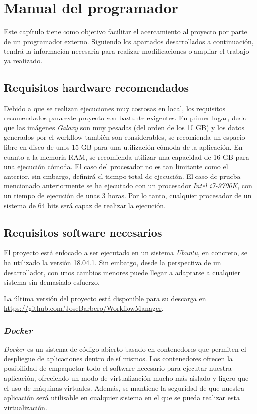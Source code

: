 \chapter{Manual del programador}
\label{Anexo:ManualProgramador}
Este capítulo tiene como objetivo facilitar el acercamiento al proyecto por parte de un programador externo. Siguiendo los apartados desarrollados a continuación, tendrá la información necesaria para realizar modificaciones o ampliar el trabajo ya realizado.

\section{Requisitos hardware recomendados}
Debido a que se realizan ejecuciones muy costosas en local, los requisitos recomendados para este proyecto son bastante exigentes.
En primer lugar, dado que las imágenes \textit{Galaxy} son muy pesadas (del orden de los 10 GB) y los datos generados por el workflow también son considerables, se recomienda un espacio libre en disco de unos 15 GB para una utilización cómoda de la aplicación.
En cuanto a la memoria RAM, se recomienda utilizar una capacidad de 16 GB para una ejecución cómoda.
El caso del procesador no es tan limitante como el anterior, sin embargo, definirá el tiempo total de ejecución. El caso de prueba mencionado anteriormente se ha ejecutado con un procesador \textit{Intel i7-9700K}, con un tiempo de ejecución de unas 3 horas. Por lo tanto, cualquier procesador de un sistema de 64 bits será capaz de realizar la ejecución.

\section{Requisitos software necesarios}

El proyecto está enfocado a ser ejecutado en un sistema \textit{Ubuntu}, en concreto, se ha utilizado la versión 18.04.1. Sin embargo, desde la perspectiva de un desarrollador, con unos cambios menores puede llegar a adaptarse a cualquier sistema sin demasiado esfuerzo.

La última versión del proyecto está disponible para su descarga en \url{https://github.com/JoseBarbero/WorkflowManager}.
    \subsection{\textit{Docker}}
    \textit{Docker} es un sistema de código abierto basado en contenedores que permiten el despliegue de aplicaciones dentro de sí mismos. Los contenedores ofrecen la posibilidad de empaquetar todo el software necesario para ejecutar nuestra aplicación, ofreciendo un modo de virtualización mucho más aislado y ligero que el uso de máquinas virtuales. Además, se mantiene la seguridad de que nuestra aplicación será utilizable en cualquier sistema en el que se pueda realizar esta virtualización.
    
